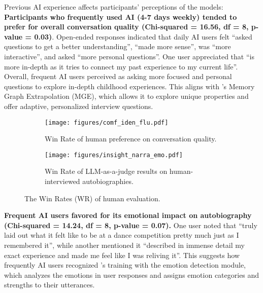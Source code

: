Previous AI experience affects participants' perceptions of the models:
\textbf{Participants who frequently used AI (4-7 days weekly) tended to prefer \methodname for overall conversation quality (Chi-squared = 16.56, df = 8, p-value = 0.03)}. Open-ended responses indicated that daily AI users felt \methodname ``asked questions to get a better understanding'', ``made more sense'', was ``more interactive'', and asked ``more personal questions''. One user appreciated that ``\methodname is more in-depth as it tries to connect my past experience to my current life''. Overall, frequent AI users perceived \methodname as asking more focused and personal questions to explore in-depth childhood experiences. This aligns with \methodname’s Memory Graph Extrapolation (MGE), which allows it to explore unique properties and offer adaptive, personalized interview questions.
\begin{figure}[t]
\vspace{-1mm}
    \centering
    \begin{subfigure}[b]{\linewidth}
        \centering
        \texttt{[image: figures/comf\_iden\_flu.pdf]}
        \caption{Win Rate of human preference on conversation quality.}
        \label{fig:win_rate_conv}
    \end{subfigure}
    
    \begin{subfigure}[b]{\linewidth}
        \centering
        \texttt{[image: figures/insight\_narra\_emo.pdf]}
        \caption{Win Rate of LLM-as-a-judge results on human-interviewed autobiographies.}
        \label{fig:win_rate_autobio}
    \end{subfigure}
    \vspace{-5mm}
    \caption{The Win Rates (WR) of human evaluation.}
    \label{fig:win_rate}
    \vspace{-6mm}
\end{figure}
\noindent \textbf{Frequent AI users favored \methodname for its emotional impact on autobiography (Chi-squared = 14.24, df = 8, p-value = 0.07). }One user noted that \methodname ``truly laid out what it felt like to be at a dance competition pretty much just as I remembered it'', while another mentioned it ``described in immense detail my exact experience and made me feel like I was reliving it''. This suggests how frequently AI users recognized \methodname’s training with the emotion detection module, which analyzes the emotions in user responses and assigns emotion categories and strengths to their utterances.
